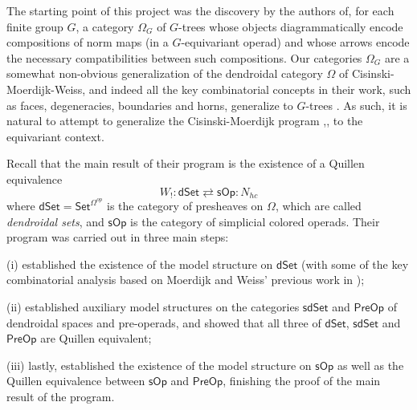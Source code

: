 \documentclass[a4paper,10pt
,draft
]{article}%
\begin{document}
The starting point of this project was the discovery by the authors of,
for each finite group $G$,
a category $\Omega_G$ of $G$-trees whose objects diagrammatically encode compositions of norm maps 
(in a $G$-equivariant operad)
and whose arrows encode the necessary compatibilities between such compositions.
Our categories $\Omega_G$ are a somewhat non-obvious  generalization of the dendroidal category $\Omega$
of Cisinski-Moerdijk-Weiss, 
and indeed all the key combinatorial concepts in their work,
such as faces, degeneracies, boundaries and horns, generalize to $G$-trees \cite[\S 5,\S 6]{Per18}.
As such, it is natural to attempt to generalize the 
Cisinski-Moerdijk program \cite{CM11},\cite{CM13a},\cite{CM13b} to the equivariant context. 

Recall that the main result of their program is the existence of a Quillen equivalence
\[
	W_{!} \colon \mathsf{dSet} 
		\rightleftarrows
	\mathsf{sOp}  \colon N_{hc} 
\]
where $\mathsf{dSet} = \mathsf{Set}^{\Omega^{op}} $
is the category of presheaves on $\Omega$, 
which are called \textit{dendroidal sets},
and 
$\mathsf{sOp}$ is the category of simplicial colored operads.
Their program was carried out in three main steps:
\begin{inparaenum}
	\item[(i)] \cite{CM11} established the existence of the model structure on $\mathsf{dSet}$
	(with some of the key combinatorial analysis based on Moerdijk and Weiss' previous work in \cite{MW09});
	\item[(ii)] \cite{CM13a} established auxiliary model structures on the categories $\mathsf{sdSet}$ and $\mathsf{PreOp}$
	of dendroidal spaces and pre-operads, and showed that all three of $\mathsf{dSet}$, $\mathsf{sdSet}$ and $\mathsf{PreOp}$ are Quillen equivalent;
	\item[(iii)] lastly, \cite{CM13b} established the existence of the model structure on $\mathsf{sOp}$ as well as the Quillen equivalence between $\mathsf{sOp}$ and $\mathsf{PreOp}$, finishing the proof of the main result of the program.
\end{inparaenum}
\end{document}
